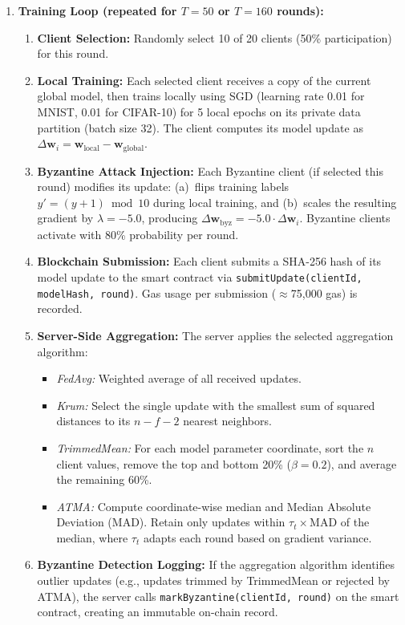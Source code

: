 \documentclass[12pt,a4paper,onecolumn]{article}
\begin{document}
\begin{enumerate}
    \item \textbf{Training Loop (repeated for $T=50$ or $T=160$ rounds):}
    \begin{enumerate}
        \item \textbf{Client Selection:} Randomly select 10 of 20 clients (50\% participation) for this round.
        \item \textbf{Local Training:} Each selected client receives a copy of the current global model, then trains locally using SGD (learning rate 0.01 for MNIST, 0.01 for CIFAR-10) for 5 local epochs on its private data partition (batch size 32). The client computes its model update as $\Delta \mathbf{w}_i = \mathbf{w}_{\text{local}} - \mathbf{w}_{\text{global}}$.
        \item \textbf{Byzantine Attack Injection:} Each Byzantine client (if selected this round) modifies its update: (a)~flips training labels $y' = (y+1) \bmod 10$ during local training, and (b)~scales the resulting gradient by $\lambda = -5.0$, producing $\Delta \mathbf{w}_{\text{byz}} = -5.0 \cdot \Delta \mathbf{w}_i$. Byzantine clients activate with 80\% probability per round.
        \item \textbf{Blockchain Submission:} Each client submits a SHA-256 hash of its model update to the smart contract via \texttt{submitUpdate(clientId, modelHash, round)}. Gas usage per submission ($\approx$75,000 gas) is recorded.
        \item \textbf{Server-Side Aggregation:} The server applies the selected aggregation algorithm:
        \begin{itemize}
            \item \emph{FedAvg:} Weighted average of all received updates.
            \item \emph{Krum:} Select the single update with the smallest sum of squared distances to its $n - f - 2$ nearest neighbors.
            \item \emph{TrimmedMean:} For each model parameter coordinate, sort the $n$ client values, remove the top and bottom 20\% ($\beta = 0.2$), and average the remaining 60\%.
            \item \emph{ATMA:} Compute coordinate-wise median and Median Absolute Deviation (MAD). Retain only updates within $\tau_t \times \text{MAD}$ of the median, where $\tau_t$ adapts each round based on gradient variance.
        \end{itemize}
        \item \textbf{Byzantine Detection Logging:} If the aggregation algorithm identifies outlier updates (e.g., updates trimmed by TrimmedMean or rejected by ATMA), the server calls \texttt{markByzantine(clientId, round)} on the smart contract, creating an immutable on-chain record.

\end{enumerate}
\end{enumerate}
\end{document}
